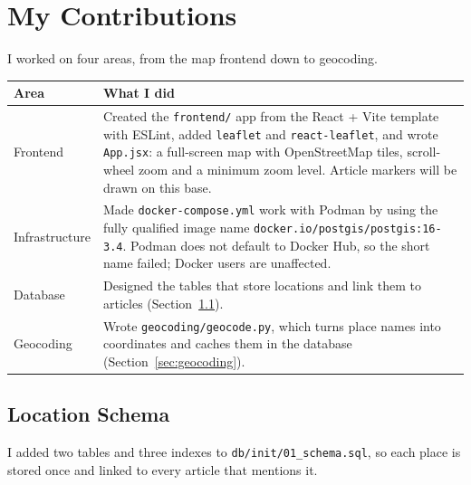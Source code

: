 \documentclass[11pt,a4paper]{article}
\begin{document}
\section{My Contributions}

I worked on four areas, from the map frontend down to geocoding.

\begin{center}
\begin{tabularx}{\textwidth}{@{}p{}L@{}}
\toprule
\textbf{Area} & \textbf{What I did} \\
\midrule
Frontend &
  Created the \texttt{frontend/} app from the React + Vite template with
  ESLint, added \texttt{leaflet} and \texttt{react-leaflet}, and wrote
  \texttt{App.jsx}: a full-screen map with OpenStreetMap tiles, scroll-wheel
  zoom and a minimum zoom level. Article markers will be drawn on this base. \\
Infrastructure &
  Made \texttt{docker-compose.yml} work with Podman by using the fully
  qualified image name \texttt{docker.io/postgis/postgis:16-3.4}. Podman does
  not default to Docker Hub, so the short name failed; Docker users are
  unaffected. \\
Database &
  Designed the tables that store locations and link them to articles
  (Section~\ref{sec:schema}). \\
Geocoding &
  Wrote \texttt{geocoding/geocode.py}, which turns place names into
  coordinates and caches them in the database (Section~\ref{sec:geocoding}). \\
\bottomrule
\end{tabularx}
\end{center}

\subsection{Location Schema}
\label{sec:schema}

I added two tables and three indexes to \texttt{db/init/01\_schema.sql}, so
each place is stored once and linked to every article that mentions it.
\end{document}
